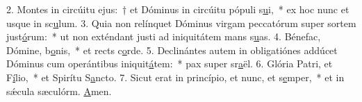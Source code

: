2. Montes in circúitu ejus:~† et Dóminus in circúitu pópuli s\uline{u}i,~* ex hoc nunc et usque in sc\uline{u}lum.
3. Quia non relínquet Dóminus virgam peccatórum super sortem just\uline{ó}rum:~* ut non exténdant justi ad iniquitátem mans s\uline{u}as.
4. Bénefac, Dómine, b\uline{o}nis,~* et rects c\uline{o}rde.
5. Declinántes autem in obligatiónes addúcet Dóminus cum operántibus iniquit\uline{á}tem:~* pax super sr\uline{a}ël.
6. Glória Patri, et F\uline{í}lio,~* et Spirítu S\uline{a}ncto.
7. Sicut erat in princípio, et nunc, et s\uline{e}mper,~* et in sǽcula sæculórm. \uline{A}men.
